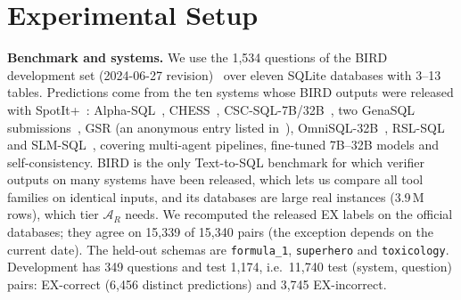\section{Experimental Setup}\label{sec:setup}

\textbf{Benchmark and systems.} We use the 1,534 questions of the BIRD development set (2024-06-27 revision)~\cite{li2023bird} over eleven SQLite databases with 3--13 tables. Predictions come from the ten systems whose BIRD outputs were released with SpotIt+~\cite{tremante2026spotitplus}: Alpha-SQL~\cite{li2025alphasql}, CHESS~\cite{talaei2024chess}, CSC-SQL-7B/32B~\cite{sheng2025cscsql}, two GenaSQL submissions~\cite{donder2025genasql}, GSR (an anonymous entry listed in~\cite{tremante2026spotitplus}), OmniSQL-32B~\cite{li2025omnisql}, RSL-SQL~\cite{cao2024rslsql} and SLM-SQL~\cite{sheng2025slmsql}, covering multi-agent pipelines, fine-tuned 7B--32B models and self-consistency. BIRD is the only Text-to-SQL benchmark for which verifier outputs on many systems have been released, which lets us compare all tool families on identical inputs, and its databases are large real instances (3.9\,M rows), which tier $\mathcal A_R$ needs. We recomputed the released EX labels on the official databases; they agree on 15,339 of 15,340 pairs (the exception depends on the current date). The held-out schemas are \texttt{formula\_1}, \texttt{superhero} and \texttt{toxicology}. Development has 349 questions and test 1,174, i.e.\ 11,740 test (system, question) pairs:  EX-correct (6,456 distinct predictions) and 3,745 EX-incorrect.

